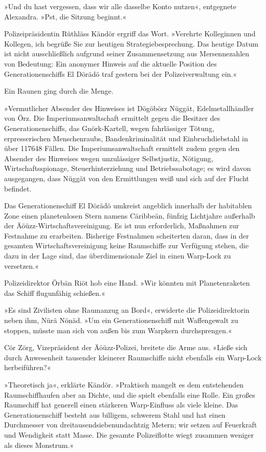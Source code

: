 »Und du hast vergessen, dass wir alle dasselbe Konto nutzen«, entgegnete Alexandra. »Pst, die Sitzung beginnt.«

Polizeipräsidentin Rüthläss Kändör ergriff das Wort. »Verehrte Kolleginnen und Kollegen, ich begrüße Sie zur heutigen Strategiebesprechung. Das heutige Datum ist nicht ausschließlich aufgrund seiner Zusammensetzung aus Mersennezahlen von Bedeutung: Ein anonymer Hinweis auf die aktuelle Position des Generationenschiffs El Dörädö traf gestern bei der Polizeiverwaltung ein.«

Ein Raunen ging durch die Menge.

»Vermutlicher Absender des Hinweises ist Dögöbörz Nüggät, Edelmetallhändler von Örz. Die Imperiumsanwaltschaft ermittelt gegen die Besitzer des Generationenschiffs, das Gnörk-Kartell, wegen fahrlässiger Tötung, erpresserischen Menschenraubs, Bandenkriminalität und Einbruchdiebstahl in über 117648 Fällen. Die Imperiumsanwaltschaft ermittelt zudem gegen den Absender des Hinweises wegen unzulässiger Selbstjustiz, Nötigung, Wirtschaftsspionage, Steuerhinterziehung und Betriebssabotage; es wird davon ausgegangen, dass Nüggät von den Ermittlungen weiß und sich auf der Flucht befindet.

Das Generationenschiff El Dörädö umkreist angeblich innerhalb der habitablen Zone einen planetenlosen Stern namens Cäribbeän, fünfzig Lichtjahre außerhalb der Äöüzz-Wirtschaftsvereinigung. Es ist nun erforderlich, Maßnahmen zur Festnahme zu erarbeiten. Bisherige Festnahmen scheiterten daran, dass in der gesamten Wirtschaftsvereinigung keine Raumschiffe zur Verfügung stehen, die dazu in der Lage sind, das überdimensionale Ziel in einen Warp-Lock zu versetzen.«

Polizeidirektor Örbän Riöt hob eine Hand. »Wir könnten mit Planetenraketen das Schiff flugunfähig schießen.«

»Es sind Zivilisten ohne Raumanzug an Bord«, erwiderte die Polizeidirektorin neben ihm, Nürä Nönäd. »Um ein Generationenschiff mit Waffengewalt zu stoppen, müsste man sich von außen bis zum Warpkern durchsprengen.«

Cör Zörg, Vizepräsident der Äöüzz-Polizei, breitete die Arme aus. »Ließe sich durch Anwesenheit tausender kleinerer Raumschiffe nicht ebenfalls ein Warp-Lock herbeiführen?«

»Theoretisch ja«, erklärte Kändör. »Praktisch mangelt es dem entstehenden Raumschiffhaufen aber an Dichte, und die spielt ebenfalls eine Rolle. Ein großes Raumschiff hat generell einen stärkeren Warp-Einfluss als viele kleine. Das Generationenschiff besteht aus billigem, schwerem Stahl und hat einen Durchmesser von dreitausendsiebenundachtzig Metern; wir setzen auf Feuerkraft und Wendigkeit statt Masse. Die gesamte Polizeiflotte wiegt zusammen weniger als dieses Monstrum.«

